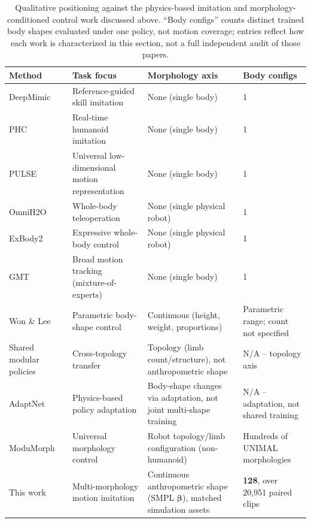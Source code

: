 \begin{table}[t]
\centering
\small
\caption{Qualitative positioning against the physics-based imitation and
morphology-conditioned control work discussed above. ``Body configs'' counts
distinct trained body shapes evaluated under one policy, not motion coverage;
entries reflect how each work is characterized in this section, not a full
independent audit of those papers.}\label{tab:related_work_comparison}
\begin{tabularx}{\linewidth}{@{}lYYY@{}}
\toprule
Method & Task focus & Morphology axis & Body configs \\
\midrule
DeepMimic~\cite{deepmimic} & Reference-guided skill imitation & None (single body) & 1 \\
PHC~\cite{phc} & Real-time humanoid imitation & None (single body) & 1 \\
PULSE~\cite{pulse} & Universal low-dimensional motion representation & None (single body) & 1 \\
OmniH2O~\cite{omnih2o} & Whole-body teleoperation & None (single physical robot) & 1 \\
ExBody2~\cite{exbody2} & Expressive whole-body control & None (single physical robot) & 1 \\
GMT~\cite{gmt} & Broad motion tracking (mixture-of-experts) & None (single body) & 1 \\
Won \& Lee~\cite{won2019} & Parametric body-shape control & Continuous (height, weight, proportions) & Parametric range; count not specified \\
Shared modular policies~\cite{smp2020} & Cross-topology transfer & Topology (limb count/structure), not anthropometric shape & N/A -- topology axis \\
AdaptNet~\cite{adaptnet} & Physics-based policy adaptation & Body-shape changes via adaptation, not joint multi-shape training & N/A -- adaptation, not shared training \\
ModuMorph~\cite{modumorph} & Universal morphology control & Robot topology/limb configuration (non-humanoid) & Hundreds of UNIMAL morphologies \\
\midrule
This work & Multi-morphology motion imitation & Continuous anthropometric shape (SMPL $\boldsymbol{\beta}$), matched simulation assets & \textbf{128}, over 20,951 paired clips \\
\bottomrule
\end{tabularx}
\end{table}

